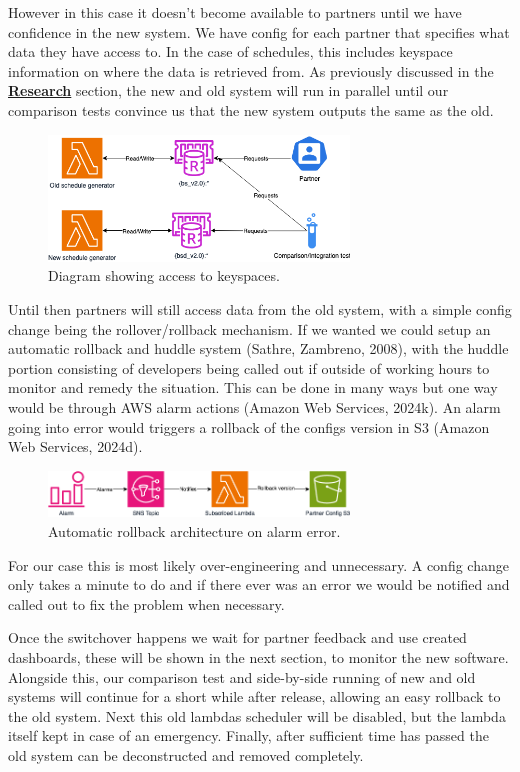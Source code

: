   However in this case it doesn't become available to partners until we have confidence in the new system. We have config for each partner that 
  specifies what data they have access to. In the case of schedules, this includes keyspace information on where the data is retrieved from. As 
  previously discussed in the \hyperref[sec:cicd]{\textbf{Research}} section, the new and old system will run in parallel until our comparison tests 
  convince us that the new system outputs the same as the old.

  \begin{figure}[H]
    \centering
    \includegraphics[width=8cm]{assets/keyspaceAccess.drawio.png}
    \caption{Diagram showing access to keyspaces.}
    \label{fig:keySpaceAccess}
  \end{figure}

  Until then partners will still access data from the old system, with a simple config change being the rollover/rollback mechanism. If we wanted we 
  could setup an automatic rollback and huddle system (Sathre, Zambreno, 2008), with the huddle portion consisting of developers being called out if 
  outside of working hours to monitor and remedy the situation. This can be done in many ways but one way would be through AWS alarm 
  actions (Amazon Web Services, 2024k). An alarm going into error would  triggers a rollback of the configs version in S3 (Amazon Web Services, 2024d).

  \begin{figure}[H]
    \centering
    \includegraphics[width=8cm]{assets/rollback.drawio.png}
    \caption{Automatic rollback architecture on alarm error.}
    \label{fig:rollback}
  \end{figure}

  For our case this is most likely over-engineering and unnecessary. A config change only takes a minute to do and if there ever was an error we 
  would be notified and called out to fix the problem when necessary. 

  Once the switchover happens we wait for partner feedback and use created dashboards, these will be shown in the next section, to monitor 
  the new software. Alongside this, our comparison test and side-by-side running of new and old systems will continue for a short while after release, 
  allowing an easy rollback to the old system. Next this old lambdas scheduler will be disabled, but the lambda itself kept in case of an emergency. 
  Finally, after sufficient time has passed the old system can be deconstructed and removed completely.

\newpage
